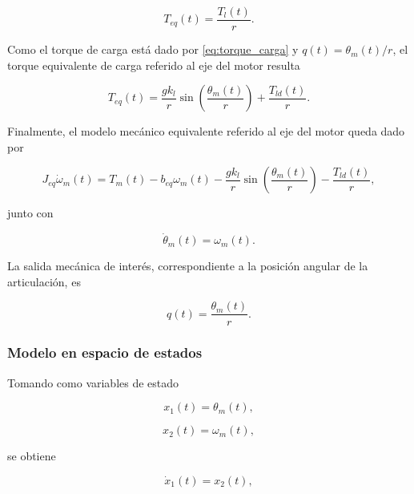 \documentclass[10pt,a4paper]{article}
\begin{document}
\begin{equation}
    T_{eq}(t)
    =
    \frac{T_l(t)}{r}.
    \label{eq:teq}
\end{equation}

Como el torque de carga está dado por \eqref{eq:torque_carga} y \(q(t)=\theta_m(t)/r\), el torque equivalente de carga referido al eje del motor resulta

\begin{equation}
    T_{eq}(t)
    =
    \frac{g k_l}{r}
    \sin\left(
    \frac{\theta_m(t)}{r}
    \right)
    +
    \frac{T_{ld}(t)}{r}.
    \label{eq:torque_eq_completo}
\end{equation}

Finalmente, el modelo mecánico equivalente referido al eje del motor queda dado por

\begin{equation}
    J_{eq}\dot{\omega}_m(t)
    =
    T_m(t)
    -
    b_{eq}\omega_m(t)
    -
    \frac{g k_l}{r}
    \sin\left(
    \frac{\theta_m(t)}{r}
    \right)
    -
    \frac{T_{ld}(t)}{r},
    \label{eq:modelo_mecanico_final}
\end{equation}

junto con

\begin{equation}
    \dot{\theta}_m(t)
    =
    \omega_m(t).
    \label{eq:theta_dot_final}
\end{equation}

La salida mecánica de interés, correspondiente a la posición angular de la articulación, es

\begin{equation}
    q(t)
    =
    \frac{\theta_m(t)}{r}.
    \label{eq:salida_articulacion}
\end{equation}

\subsubsection{Modelo en espacio de estados}

Tomando como variables de estado

\begin{equation}
    x_1(t)=\theta_m(t),
\end{equation}

\begin{equation}
    x_2(t)=\omega_m(t),
\end{equation}

se obtiene

\begin{equation}
    \dot{x}_1(t)
    =
    x_2(t),
    \label{eq:x1_mecanico}
\end{equation}
\end{document}
